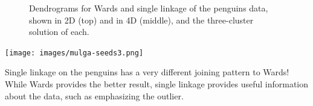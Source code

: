 \documentclass[
  letterpaper,
]{krantz}
\newenvironment{Shaded}{\begin{snugshade}}{\end{snugshade}}
\newcommand{\AttributeTok}[1]{\textcolor[rgb]{0.40,0.45,0.13}{#1}}
\newcommand{\CommentTok}[1]{\textcolor[rgb]{0.37,0.37,0.37}{#1}}
\newcommand{\DecValTok}[1]{\textcolor[rgb]{0.68,0.00,0.00}{#1}}
\newcommand{\FloatTok}[1]{\textcolor[rgb]{0.68,0.00,0.00}{#1}}
\newcommand{\FunctionTok}[1]{\textcolor[rgb]{0.28,0.35,0.67}{#1}}
\newcommand{\NormalTok}[1]{\textcolor[rgb]{0.00,0.23,0.31}{#1}}
\newcommand{\OtherTok}[1]{\textcolor[rgb]{0.00,0.23,0.31}{#1}}
\newcommand{\SpecialCharTok}[1]{\textcolor[rgb]{0.37,0.37,0.37}{#1}}
\newcommand{\StringTok}[1]{\textcolor[rgb]{0.13,0.47,0.30}{#1}}
\newcommand{\insightbox}[1]{%
\noindent\colorbox{insight!30}{%
\begin{minipage}{0.98\textwidth}%
    \centering%
    \begin{minipage}[c]{0.15\textwidth} %
      \texttt{[image: images/mulga-seeds3.png]} %
    \end{minipage}%
    \hfill %
    \begin{minipage}[c]{0.8\textwidth} %
      \bigskip%
      \textsf{#1}%
      \bigskip%
    \end{minipage}%
    \hspace*{3mm}%
  \end{minipage}%
}%
}
\begin{document}
\begin{figure}
\begin{minipage}{0.50\linewidth}
{}


\end{minipage}%

\caption{\label{fig-penguins-hfly-pdf}Dendrograms for Wards and single
linkage of the penguins data, shown in 2D (top) and in 4D (middle), and
the three-cluster solution of each.}

\end{figure}%

\insightbox{Single linkage on the penguins has a very different joining pattern to Wards! While Wards provides the better result, single linkage provides useful information about the data, such as emphasizing the outlier.}

\begin{Shaded}
\end{Shaded}
\end{document}
